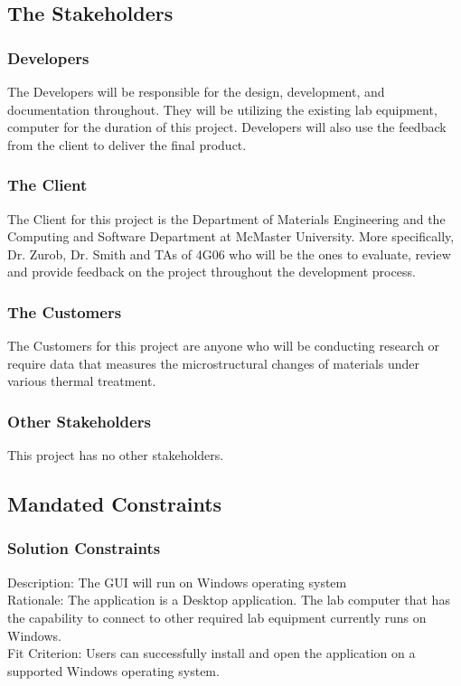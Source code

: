 \documentclass[12pt, titlepage]{article}
\begin{document}
\subsection{The Stakeholders}

\subsubsection{Developers}
The Developers will be responsible for the design, development, and documentation throughout. They will be utilizing the existing lab equipment, computer for the duration of this project.
Developers will also use the feedback from the client to deliver the final product. 

\subsubsection{The Client}
The Client for this project is the Department of Materials Engineering and the Computing and Software Department at McMaster University. More specifically, Dr. Zurob, Dr. Smith and TAs of 4G06 who will be the ones to evaluate, review and provide feedback on the project throughout the development process.

\subsubsection{The Customers}
The Customers for this project are anyone who will be conducting research or require data that measures the microstructural changes of materials under various thermal treatment.   

\subsubsection{Other Stakeholders}
This project has no other stakeholders.

\subsection{Mandated Constraints}

\subsubsection{Solution Constraints}

Description: The GUI will run on Windows operating system\\ 
Rationale: The application is a Desktop application. The lab computer that has the capability to connect to other required lab equipment currently runs on Windows.\\
Fit Criterion: Users can successfully install and open the application on a supported Windows operating system. \\
\end{document}
